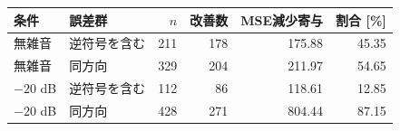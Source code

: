 \begin{tabular}{llrrrr}
\toprule
条件 & 誤差群 & $n$ & 改善数 & MSE減少寄与 & 割合 [\%] \\
\midrule
無雑音 & 逆符号を含む & 211 & 178 & 175.88 & 45.35 \\
無雑音 & 同方向 & 329 & 204 & 211.97 & 54.65 \\
$-20$ dB & 逆符号を含む & 112 & 86 & 118.61 & 12.85 \\
$-20$ dB & 同方向 & 428 & 271 & 804.44 & 87.15 \\
\bottomrule
\end{tabular}
